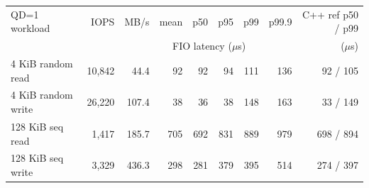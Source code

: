 \begin{tabular}{lrrrrrrrr}
\toprule
QD=1 workload & IOPS & MB/s & mean & p50 & p95 & p99 & p99.9 & C++ ref p50 / p99 \\
 & & & \multicolumn{4}{c}{FIO latency ($\mu$s)} & & ($\mu$s) \\
\midrule
4 KiB random read & 10,842 & 44.4 & 92 & 92 & 94 & 111 & 136 & 92 / 105 \\
4 KiB random write & 26,220 & 107.4 & 38 & 36 & 38 & 148 & 163 & 33 / 149 \\
128 KiB seq read & 1,417 & 185.7 & 705 & 692 & 831 & 889 & 979 & 698 / 894 \\
128 KiB seq write & 3,329 & 436.3 & 298 & 281 & 379 & 395 & 514 & 274 / 397 \\
\bottomrule
\end{tabular}
